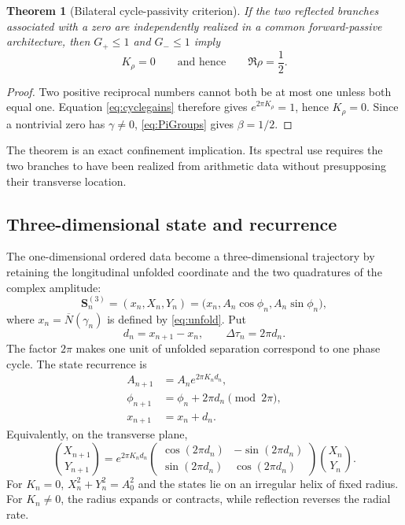 \documentclass[11pt]{amsart}
\newtheorem{theorem}{Theorem}[section]
\theoremstyle{definition}
\theoremstyle{remark}
\begin{document}
\begin{theorem}[Bilateral cycle-passivity criterion]\label{thm:cycle-passivity}
If the two reflected branches associated with a zero are independently realized in a common
forward-passive architecture, then $G_+\le1$ and $G_-\le1$ imply
\[
 K_\rho=0\qquad\text{and hence}\qquad\Re\rho=\frac12.
\]
\end{theorem}
\begin{proof}
Two positive reciprocal numbers cannot both be at most one unless both equal one.
Equation \eqref{eq:cyclegains} therefore gives $e^{2\pi K_\rho}=1$, hence $K_\rho=0$.
Since a nontrivial zero has $\gamma\ne0$, \eqref{eq:PiGroups} gives $\beta=1/2$.
\end{proof}

The theorem is an exact confinement implication.  Its spectral use requires the two branches
to have been realized from arithmetic data without presupposing their transverse location.

\subsection{Three-dimensional state and recurrence}
The one-dimensional ordered data become a three-dimensional trajectory by retaining the
longitudinal unfolded coordinate and the two quadratures of the complex amplitude:
\begin{equation}\label{eq:state3d}
 \mathbf S_n^{(3)}=(x_n,X_n,Y_n)
 =\bigl(x_n,A_n\cos\phi_n,A_n\sin\phi_n\bigr),
\end{equation}
where $x_n=\overline N(\gamma_n)$ is defined by \eqref{eq:unfold}.  Put
\begin{equation}\label{eq:gapandphase}
 d_n=x_{n+1}-x_n,
 \qquad \Delta\tau_n=2\pi d_n.
\end{equation}
The factor $2\pi$ makes one unit of unfolded separation correspond to one phase cycle.  The
state recurrence is
\begin{align}
 A_{n+1}&=A_ne^{2\pi K_nd_n},\label{eq:amprecurrence}\\
 \phi_{n+1}&=\phi_n+2\pi d_n\pmod{2\pi},\label{eq:phaserecurrence}\\
 x_{n+1}&=x_n+d_n.\label{eq:xrecurrence}
\end{align}
Equivalently, on the transverse plane,
\begin{equation}\label{eq:matrixtransition}
 \binom{X_{n+1}}{Y_{n+1}}
 =e^{2\pi K_nd_n}
 \begin{pmatrix}
 \cos(2\pi d_n)&-\sin(2\pi d_n)\\
 \sin(2\pi d_n)& \cos(2\pi d_n)
 \end{pmatrix}
 \binom{X_n}{Y_n}.
\end{equation}
For $K_n=0$, $X_n^2+Y_n^2=A_0^2$ and the states lie on an irregular helix of fixed radius.
For $K_n\ne0$, the radius expands or contracts, while reflection reverses the radial rate.
\end{document}

